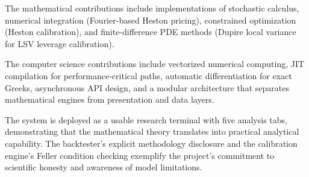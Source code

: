 \documentclass[12pt,a4paper]{article}
\begin{document}
The mathematical contributions include implementations of stochastic calculus, numerical integration (Fourier-based Heston pricing), constrained optimization (Heston calibration), and finite-difference PDE methods (Dupire local variance for LSV leverage calibration).

The computer science contributions include vectorized numerical computing, JIT compilation for performance-critical paths, automatic differentiation for exact Greeks, asynchronous API design, and a modular architecture that separates mathematical engines from presentation and data layers.

The system is deployed as a usable research terminal with five analysis tabs, demonstrating that the mathematical theory translates into practical analytical capability. The backtester's explicit methodology disclosure and the calibration engine's Feller condition checking exemplify the project's commitment to scientific honesty and awareness of model limitations.

\printbibliography
\end{document}
